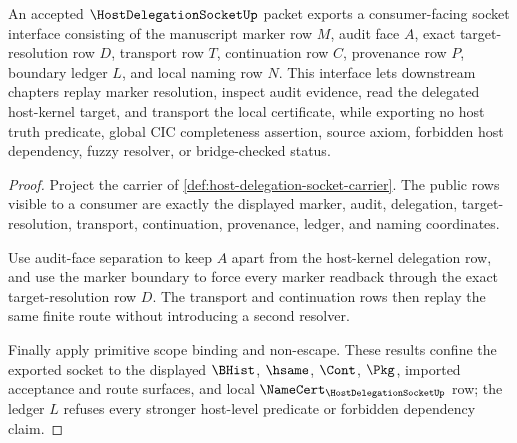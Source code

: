 \begin{theorem}
\label{thm:host-delegation-socket-public-interface}
An accepted $\HostDelegationSocketUp$ packet exports a consumer-facing socket interface consisting of the manuscript marker row $M$, audit face $A$, exact target-resolution row $D$, transport row $T$, continuation row $C$, provenance row $P$, boundary ledger $L$, and local naming row $N$. This interface lets downstream chapters replay marker resolution, inspect audit evidence, read the delegated host-kernel target, and transport the local certificate, while exporting no host truth predicate, global CIC completeness assertion, source axiom, forbidden host dependency, fuzzy resolver, or bridge-checked status.
\end{theorem}
\begin{proof}
Project the carrier of \autoref{def:host-delegation-socket-carrier}. The public rows visible to a consumer are exactly the displayed marker, audit, delegation, target-resolution, transport, continuation, provenance, ledger, and naming coordinates.

Use audit-face separation to keep $A$ apart from the host-kernel delegation row, and use the marker boundary to force every marker readback through the exact target-resolution row $D$. The transport and continuation rows then replay the same finite route without introducing a second resolver.

Finally apply primitive scope binding and non-escape. These results confine the exported socket to the displayed $\BHist$, $\hsame$, $\Cont$, $\Pkg$, imported acceptance and route surfaces, and local $\NameCert_{\HostDelegationSocketUp}$ row; the ledger $L$ refuses every stronger host-level predicate or forbidden dependency claim.
\end{proof}

